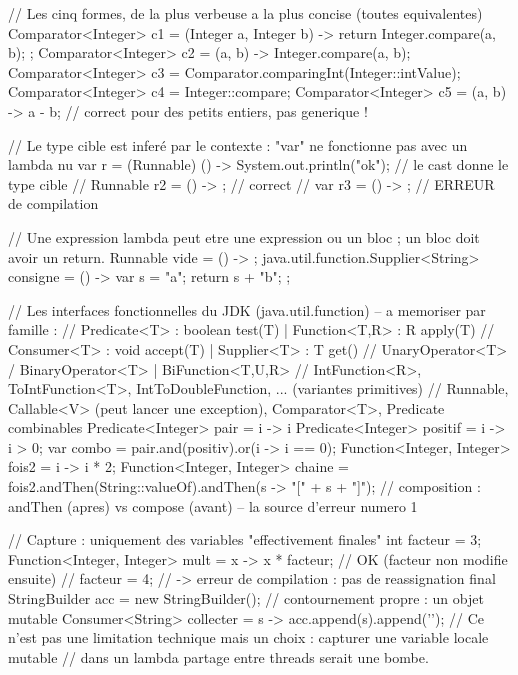 \begin{codejava}
// Les cinq formes, de la plus verbeuse a la plus concise (toutes equivalentes)
Comparator<Integer> c1 = (Integer a, Integer b) -> { return Integer.compare(a, b); };
Comparator<Integer> c2 = (a, b) -> Integer.compare(a, b);
Comparator<Integer> c3 = Comparator.comparingInt(Integer::intValue);
Comparator<Integer> c4 = Integer::compare;
Comparator<Integer> c5 = (a, b) -> a - b;             // correct pour des petits entiers, pas generique !

// Le type cible est infer\'e par le contexte : "var" ne fonctionne pas avec un lambda nu
var r = (Runnable) () -> System.out.println("ok");    // le cast donne le type cible
// Runnable r2 = () -> { };                             // correct
// var r3 = () -> { };                                  // ERREUR de compilation

// Une expression lambda peut etre une expression ou un bloc ; un bloc doit avoir un return.
Runnable vide = () -> { };
java.util.function.Supplier<String> consigne = () -> { var s = "a"; return s + "b"; };

// Les interfaces fonctionnelles du JDK (java.util.function) -- a memoriser par famille :
//   Predicate<T>  : boolean test(T)                 | Function<T,R> : R apply(T)
//   Consumer<T>   : void accept(T)                  | Supplier<T>   : T get()
//   UnaryOperator<T> / BinaryOperator<T>            | BiFunction<T,U,R>
//   IntFunction<R>, ToIntFunction<T>, IntToDoubleFunction, ... (variantes primitives)
//   Runnable, Callable<V> (peut lancer une exception), Comparator<T>, Predicate combinables
Predicate<Integer> pair = i -> i %
Predicate<Integer> positif = i -> i > 0;
var combo = pair.and(positiv).or(i -> i == 0);
Function<Integer, Integer> fois2 = i -> i * 2;
Function<Integer, Integer> chaine = fois2.andThen(String::valueOf).andThen(s -> "[" + s + "]");
// composition : andThen (apres) vs compose (avant) -- la source d'erreur numero 1

// Capture : uniquement des variables "effectivement finales"
int facteur = 3;
Function<Integer, Integer> mult = x -> x * facteur;      // OK (facteur non modifie ensuite)
// facteur = 4;                                           // -> erreur de compilation : pas de reassignation
final StringBuilder acc = new StringBuilder();            // contournement propre : un objet mutable
Consumer<String> collecter = s -> acc.append(s).append('\n');
// Ce n'est pas une limitation technique mais un choix : capturer une variable locale mutable
// dans un lambda partage entre threads serait une bombe.
\end{codejava}

